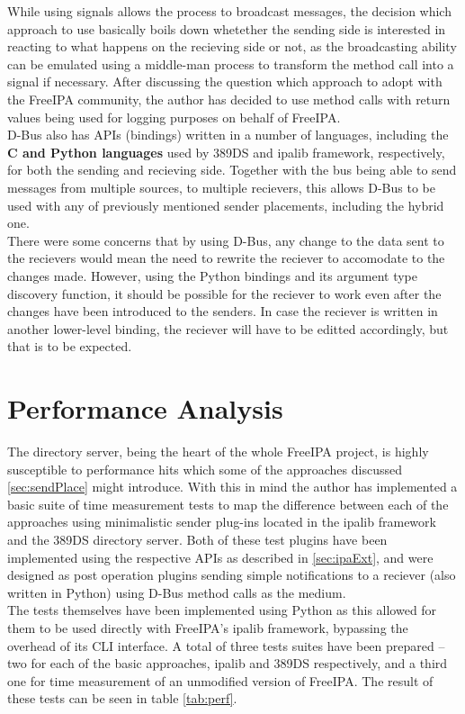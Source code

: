 While using signals allows the process to broadcast messages, the decision which approach to use basically boils down whetether the sending side is interested in reacting to what happens on the recieving side or not,
as the broadcasting ability can be emulated using a middle-man process to transform the method call into a signal if necessary. After discussing the question which approach to adopt with the FreeIPA community, the author has decided to use
method calls with return values being used for logging purposes on behalf of FreeIPA. \\
D-Bus also has APIs (bindings) written in a number of languages, including the \textbf{C and Python languages} used by 389DS and ipalib framework, respectively, for both the sending and recieving side.
Together with the bus being able to send messages from multiple sources, to multiple recievers, this allows D-Bus to be used with any of previously mentioned sender placements, including the hybrid one. \\
There were some concerns that by using D-Bus, any change to the data sent to the recievers would mean the need to rewrite the reciever to accomodate to the changes made.
However, using the Python bindings and its argument type discovery function, it should be possible for the reciever to work even after the changes have been introduced to the senders.
In case the reciever is written in another lower-level binding, the reciever will have to be editted accordingly, but that is to be expected. \\

\section{Performance Analysis}
The directory server, being the heart of the whole FreeIPA project, is highly susceptible to performance hits which some of the approaches discussed \ref{sec:sendPlace} might introduce.
With this in mind the author has implemented a basic suite of time measurement tests to map the difference between each of the approaches using minimalistic sender plug-ins located in the ipalib framework and the 389DS directory server.
Both of these test plugins have been implemented using the respective APIs as described in \ref{sec:ipaExt}, and were designed as post operation plugins sending simple notifications to a reciever (also written in Python) using D-Bus method calls as the medium. \\
The tests themselves have been implemented using Python as this allowed for them to be used directly with FreeIPA's ipalib framework, bypassing the overhead of its CLI interface. A total of three tests suites have been prepared --
two for each of the basic approaches, ipalib and 389DS respectively, and a third one for time measurement of an unmodified version of FreeIPA. The result of these tests can be seen in table \ref{tab:perf}. \\


